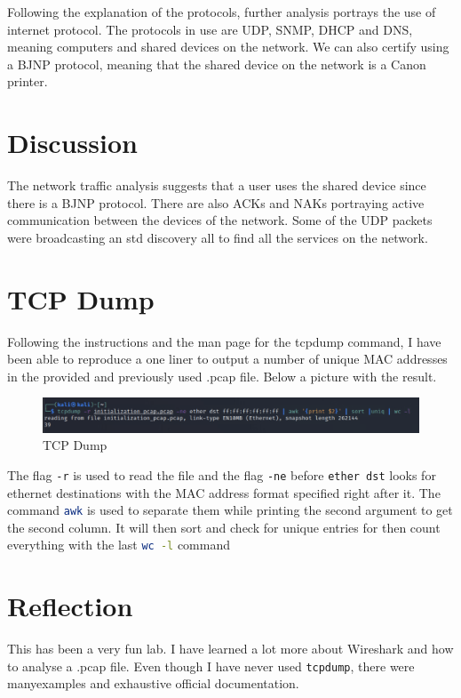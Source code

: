 Following the explanation of the protocols, further analysis portrays the use of
internet protocol. The protocols in use are UDP, SNMP, DHCP and DNS, meaning
computers and shared devices on the network. We can also certify using a BJNP
protocol, meaning that the shared device on the network is a Canon printer.

\section{Discussion}
\label{s:Lab1-Discussion}
The network traffic analysis suggests that a user uses the shared device since
there is a BJNP protocol. There are also ACKs and NAKs portraying active
communication between the devices of the network.
Some of the UDP packets were broadcasting an std discovery all to find
all the services on the network.

\section{TCP Dump}
\label{s:TCP-Dump}
Following the instructions and the man page for the tcpdump command, I have been able
to reproduce a one liner to output a number of unique MAC addresses in the provided and previously
used .pcap file. Below a picture with the result.

\begin{figure}[H]
  \centering
  \includegraphics[width=1\textwidth]{figures/tcpdump}
  \caption{TCP Dump}
  \label{f:tcpdump}
\end{figure}

The flag \lstinline[language=bash]!-r! is used to read the file and the flag
\lstinline[language=bash]!-ne! before \lstinline[language=bash]!ether dst! looks
for ethernet destinations with the MAC address format specified right after it.
The command \lstinline[language=bash]!awk! is used to separate them while printing the
second argument to get the second column. It will then sort and check for unique
entries for then count everything with the last \lstinline[language=bash]!wc -l! command

\section{Reflection}
\label{s:Lab1-Reflection}
This has been a very fun lab. I have learned a lot more about Wireshark and how
to analyse a .pcap file. Even though I have never used
\lstinline[language=bash]!tcpdump!, there were manyexamples and exhaustive
official documentation.

